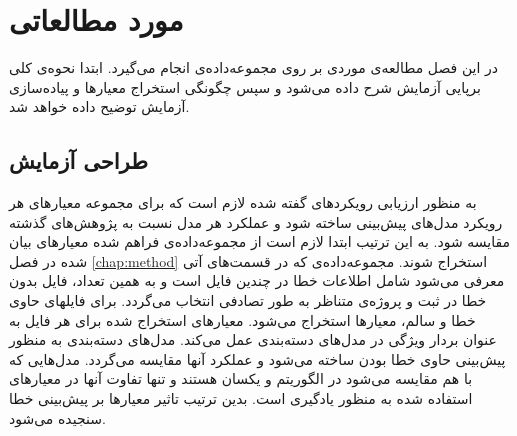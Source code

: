 \chapter{مورد مطالعاتی}
\label{chap:case-study}
در این فصل مطالعه‌ی موردی بر روی مجموعه‌داده‌ی  \cite{Just:2014:DDE:2610384.2628055} انجام می‌گیرد. ابتدا نحوه‌ی کلی برپایی آزمایش شرح داده می‌شود و سپس چگونگی استخراج معیارها و پیاده‌سازی آزمایش توضیح داده خواهد شد. 
\section{طراحی آزمایش}
به منظور ارزیابی رویکردهای گفته شده لازم است که برای مجموعه معیارهای هر رویکرد مدل‌های پیش‌بینی ساخته شود و  عملکرد هر مدل نسبت به پژوهش‌های گذشته مقایسه شود. به این ترتیب ابتدا لازم است از مجموعه‌داده‌ی فراهم شده معیارهای بیان شده در فصل \ref{chap:method} استخراج شوند. مجموعه‌داده‌ی  که در قسمت‌های آتی معرفی می‌شود شامل اطلاعات خطا در چندین فایل است و به همین تعداد، فایل بدون خطا در ثبت و پروژه‌ی متناظر به طور تصادفی انتخاب می‌گردد. برای فایلهای حاوی خطا و سالم، معیارها استخراج می‌شود. معیارهای استخراج شده  برای هر فایل به عنوان بردار ویژگی در مدل‌های دسته‌بندی عمل می‌کند. مدل‌های دسته‌بندی به منظور پیش‌بینی حاوی خطا بودن ساخته می‌شود و عملکرد آنها مقایسه می‌گردد. مدل‌هایی که با هم مقایسه می‌شود در الگوریتم و  یکسان هستند و تنها تفاوت آنها در معیارهای استفاده شده به منظور یادگیری است. بدین ترتیب تاثیر معیارها بر پیش‌بینی خطا سنجیده می‌شود. 





